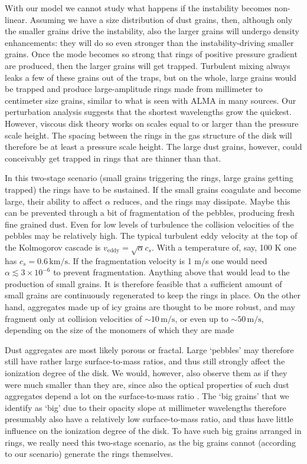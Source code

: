 \documentclass{aa}
\newcommand{\revised}[1]{{#1}}
\begin{document}
With our model we cannot study what happens if the instability becomes
non-linear. Assuming we have a size distribution of dust grains, then, although
only the smaller grains drive the instability, also the larger grains will
undergo density enhancements: they will do so even stronger than the
instability-driving smaller grains. Once the mode becomes so strong that rings
of positive pressure gradient are produced, then the larger grains will
get trapped. Turbulent mixing always leaks a few of these grains
out of the traps, but on the whole, large grains would be trapped and produce
large-amplitude rings \revised{made from millimeter to centimeter size grains,}
similar to what is seen with ALMA in many sources. \revised{Our perturbation
  analysis suggests that the shortest wavelengths grow the quickest. However,
  viscous disk theory works on scales equal to or larger than the pressure
  scale height. The spacing between the rings in the gas structure of the disk will therefore 
  be at least a pressure scale height. The large dust grains, however, could
  conceivably get trapped in rings that are thinner than that.}

\revised{In this two-stage scenario (small grains triggering the rings, large
  grains getting trapped) the rings have to be sustained. If the small grains
  coagulate and become large, their ability to affect $\alpha$ reduces, and the
  rings may dissipate. Maybe this can be prevented through a bit of
  fragmentation of the pebbles, producing fresh fine grained dust. Even for low
  levels of turbulence the collision velocities of the pebbles may be relatively
  high. The typical turbulent eddy velocity at the top of the Kolmogorov cascade
  is $v_{\mathrm{eddy}}=\sqrt{\alpha}c_s$.  With a temperature of, say, 100 K
  one has $c_s=0.6\,\mathrm{km/s}$. If the fragmentation velocity is 1 m/s
  \citep[e.g.][]{2010A&A...513A..56G} one would need $\alpha\lesssim 3\times
  10^{-6}$ to prevent fragmentation. Anything above that would lead to the
  production of small grains. It is therefore feasible that a sufficient amount
  of small grains are continuously regenerated to keep the rings in place. On
  the other hand, aggregates made up of icy grains are thought to be more
  robust, and may fragment only at collision velocities of $\sim
  10\,\mathrm{m/s}$, or even up to $\sim 50\,\mathrm{m/s}$, depending on
  the size of the monomers of which they are made \citep{2009ApJ...702.1490W}}

\revised{Dust aggregates are most likely porous or fractal. Large `pebbles'
  may therefore still have rather large surface-to-mass ratios, and thus still
  strongly affect the ionization degree of the disk. We would, however, also
  observe them as if they were much smaller than they are, since also the
  optical properties of such dust aggregates depend a lot on the surface-to-mass
  ratio \citep{2014A&A...568A..42K}. The `big grains' that we identify as
  `big' due to their opacity slope at millimeter wavelengths therefore
  presumably also have a relatively low surface-to-mass ratio, and thus have
  little influence on the ionization degree of the disk. To have such big grains
  arranged in rings, we really need this two-stage scenario, as the big grains
cannot (according to our scenario) generate the rings themselves.}
\end{document}
